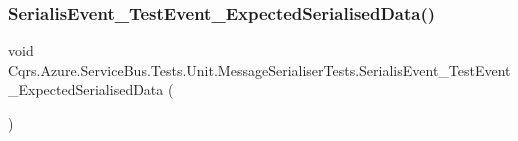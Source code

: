 \subsubsection{\texorpdfstring{Serialis\+Event\+\_\+\+Test\+Event\+\_\+\+Expected\+Serialised\+Data()}{SerialisEvent\_TestEvent\_ExpectedSerialisedData()}}
{\footnotesize\ttfamily void Cqrs.\+Azure.\+Service\+Bus.\+Tests.\+Unit.\+Message\+Serialiser\+Tests.\+Serialis\+Event\+\_\+\+Test\+Event\+\_\+\+Expected\+Serialised\+Data (\begin{DoxyParamCaption}{ }\end{DoxyParamCaption})}

